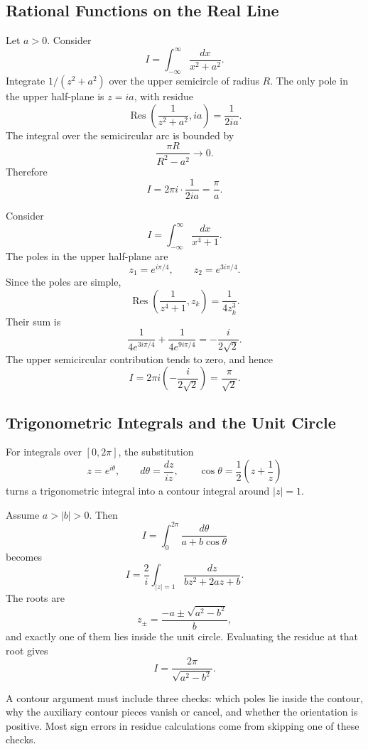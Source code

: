 \subsection{Rational Functions on the Real Line}

\begin{example}
Let $a>0$. Consider
\[
    I=\int_{-\infty}^{\infty}\frac{dx}{x^2+a^2}.
\]
Integrate $1/(z^2+a^2)$ over the upper semicircle of radius $R$. The only pole in the upper half-plane is $z=ia$, with residue
\[
    \operatorname{Res}\left(\frac{1}{z^2+a^2},ia\right)
    =\frac{1}{2ia}.
\]
The integral over the semicircular arc is bounded by
\[
    \frac{\pi R}{R^2-a^2}\longrightarrow0.
\]
Therefore
\[
    I=2\pi i\cdot\frac{1}{2ia}=\frac{\pi}{a}.
\]
\end{example}

\begin{example}
Consider
\[
    I=\int_{-\infty}^{\infty}\frac{dx}{x^4+1}.
\]
The poles in the upper half-plane are
\[
    z_1=e^{i\pi/4},\qquad z_2=e^{3i\pi/4}.
\]
Since the poles are simple,
\[
    \operatorname{Res}\left(\frac{1}{z^4+1},z_k\right)
    =\frac{1}{4z_k^3}.
\]
Their sum is
\[
    \frac{1}{4e^{3i\pi/4}}+\frac{1}{4e^{9i\pi/4}}
    =-\frac{i}{2\sqrt2}.
\]
The upper semicircular contribution tends to zero, and hence
\[
    I=2\pi i\left(-\frac{i}{2\sqrt2}\right)
    =\frac{\pi}{\sqrt2}.
\]
\end{example}

\subsection{Trigonometric Integrals and the Unit Circle}

For integrals over $[0,2\pi]$, the substitution
\[
    z=e^{i\theta},\qquad
    d\theta=\frac{dz}{iz},\qquad
    \cos\theta=\frac12\left(z+\frac1z\right)
\]
turns a trigonometric integral into a contour integral around $|z|=1$.

\begin{example}
Assume $a>|b|>0$. Then
\[
    I=\int_0^{2\pi}\frac{d\theta}{a+b\cos\theta}
\]
becomes
\[
    I=\frac{2}{i}\int_{|z|=1}
    \frac{dz}{bz^2+2az+b}.
\]
The roots are
\[
    z_{\pm}=\frac{-a\pm\sqrt{a^2-b^2}}{b},
\]
and exactly one of them lies inside the unit circle. Evaluating the residue at that root gives
\[
    I=\frac{2\pi}{\sqrt{a^2-b^2}}.
\]
\end{example}

\begin{note}
A contour argument must include three checks: which poles lie inside the contour, why the auxiliary contour pieces vanish or cancel, and whether the orientation is positive. Most sign errors in residue calculations come from skipping one of these checks.
\end{note}

